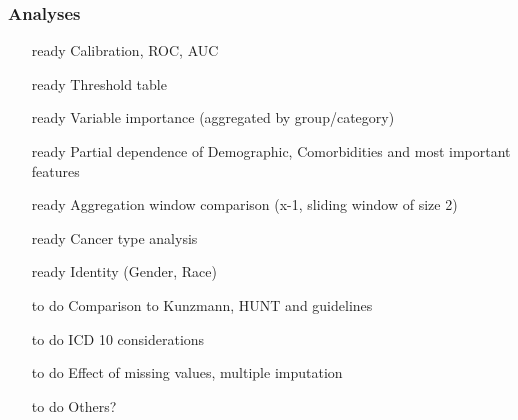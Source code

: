 \documentclass[12pt]{article}
\begin{document}
\subsubsection*{Analyses}
\begin{itemize}
	\item [ready] Calibration, ROC, AUC
	\item [ready] Threshold table
	\item [ready] Variable importance (aggregated by group/category)
	\item [ready] Partial dependence of Demographic, Comorbidities and most important features
	\item [ready] Aggregation window comparison (x-1, sliding window of size 2)
	\item [ready] Cancer type analysis
	\item [ready] Identity (Gender, Race)
	\item [to do] Comparison to Kunzmann, HUNT and guidelines
	\item [to do] ICD 10 considerations
	\item [to do] Effect of missing values, multiple imputation
	\item [to do] Others?
\end{itemize}
\end{document}
